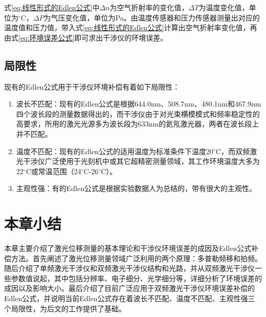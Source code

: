 式\eqref{eq:线性形式的Edlen公式}中\(\Delta n\)为空气折射率的变化值，\(\Delta T\)为温度变化值，单位为$^{\circ} \mathrm{C}$，\(\Delta P\)为气压变化值，单位为Pa。由温度传感器和压力传感器测量出对应的温度值和压力值，带入式\eqref{eq:线性形式的Edlen公式}计算出空气折射率变化值，再由式\eqref{eq:环境误差公式}即可求出干涉仪的环境误差。
\subsection{局限性}
现有的Edlen公式用于干涉仪环境补偿有着如下局限性：
\begin{enumerate}
  \item 波长不匹配：现有的Edlen公式是根据644.0nm、508.7nm、480.1nm和467.9nm四个波长段的测量数据得出的\cite{2020Effect}，而干涉仪由于对光束横模模式和频率稳定性的高要求，所用的激光光源多为波长段为633nm的氦氖激光器，两者在波长段上并不匹配。
  \item 温度不匹配：现有的Edlen公式的适用温度为标准条件下温度20$^{\circ} \mathrm{C}$\cite{2020Effect}，而双频激光干涉仪广泛使用于光刻机中或其它超精密测量领域，其工作环境温度大多为22$^{\circ} \mathrm{C}$或常温范围（24$^{\circ} \mathrm{C}$-26$^{\circ} \mathrm{C}$）。
  \item 主观性强：有的Edlen公式是根据实验数据人为总结的，带有很大的主观性。
\end{enumerate}


\section{本章小结}
本章主要介绍了激光位移测量的基本理论和干涉仪环境误差的成因及Edlen公式补偿方法。首先阐述了激光位移测量领域广泛利用的两个原理：多普勒频移和拍频。随后介绍了单频激光干涉仪和双频激光干涉仪结构和光路，并从双频激光干涉仪一些参数值说起，其中包括分辨率、电子细分、光学细分等，详细分析了环境误差的成因以及影响大小。最后介绍了目前广泛应用于双频激光干涉仪环境误差补偿的Edlen公式，并说明当前Edlen公式存在着波长不匹配、温度不匹配、主观性强三个局限性，为后文的工作提供了基础。